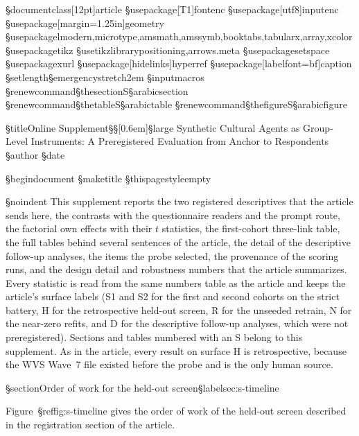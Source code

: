 §documentclass[12pt]{article}
§usepackage[T1]{fontenc}
§usepackage[utf8]{inputenc}
§usepackage[margin=1.25in]{geometry}
§usepackage{lmodern,microtype,amsmath,amssymb,booktabs,tabularx,array,xcolor}
§usepackage{tikz}
§usetikzlibrary{positioning,arrows.meta}
§usepackage{setspace}
§usepackage{xurl}
§usepackage[hidelinks]{hyperref}
§usepackage[labelfont=bf]{caption}
§setlength{§emergencystretch}{2em}
§input{macros}
§renewcommand{§thesection}{S§arabic{section}}
§renewcommand{§thetable}{S§arabic{table}}
§renewcommand{§thefigure}{S§arabic{figure}}

§title{Online Supplement§§[0.6em]§large Synthetic Cultural Agents as Group-Level Instruments: A Preregistered Evaluation from Anchor to Respondents}
§author{}
§date{}

§begin{document}
§maketitle
§thispagestyle{empty}

§noindent This supplement reports the two registered descriptives that the article sends here, the contrasts with the questionnaire readers and the prompt route, the factorial own effects with their $t$ statistics, the first-cohort three-link table, the full tables behind several sentences of the article, the detail of the descriptive follow-up analyses, the items the probe selected, the provenance of the scoring runs, and the design detail and robustness numbers that the article summarizes. Every statistic is read from the same numbers table as the article and keeps the article's surface labels (S1 and S2 for the first and second cohorts on the strict battery, H for the retrospective held-out screen, R for the unseeded retrain, N for the near-zero refits, and D for the descriptive follow-up analyses, which were not preregistered). Sections and tables numbered with an S belong to this supplement. As in the article, every result on surface H is retrospective, because the WVS Wave~7 file existed before the probe and is the only human source.

§section{Order of work for the held-out screen}§label{sec:s-timeline}

Figure~§ref{fig:s-timeline} gives the order of work of the held-out screen described in the registration section of the article.

